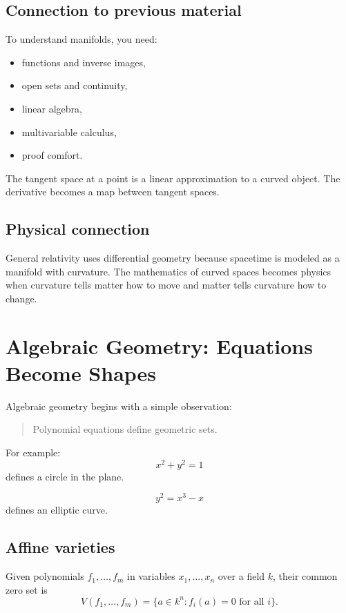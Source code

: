 \documentclass[11pt]{article}
\begin{document}
\subsection{Connection to previous material}

To understand manifolds, you need:

\begin{itemize}
\item functions and inverse images,
\item open sets and continuity,
\item linear algebra,
\item multivariable calculus,
\item proof comfort.
\end{itemize}

The tangent space at a point is a linear approximation to a curved object. The derivative becomes a map between tangent spaces.

\subsection{Physical connection}

General relativity uses differential geometry because spacetime is modeled as a manifold with curvature. The mathematics of curved spaces becomes physics when curvature tells matter how to move and matter tells curvature how to change.

\newpage
\section{Algebraic Geometry: Equations Become Shapes}

Algebraic geometry begins with a simple observation:

\begin{quote}
Polynomial equations define geometric sets.
\end{quote}

For example:
\[
x^2+y^2=1
\]
defines a circle in the plane.

\[
y^2=x^3-x
\]
defines an elliptic curve.

\subsection{Affine varieties}

\begin{definition}
Given polynomials $f_1,\ldots,f_m$ in variables $x_1,\ldots,x_n$ over a field $k$, their common zero set is
\[
V(f_1,\ldots,f_m)=\{a\in k^n:f_i(a)=0\text{ for all }i\}.
\]
\end{definition}
\end{document}
